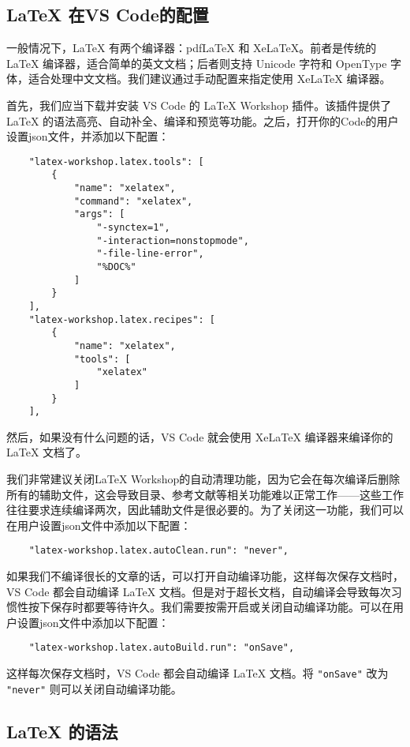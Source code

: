 \documentclass[../main.tex]{subfiles}
\begin{document}
\subsection{LaTeX 在VS Code的配置}

一般情况下，LaTeX 有两个编译器：pdfLaTeX 和 XeLaTeX。前者是传统的 LaTeX 编译器，适合简单的英文文档；后者则支持 Unicode 字符和 OpenType 字体，适合处理中文文档。我们建议通过手动配置来指定使用 XeLaTeX 编译器。

首先，我们应当下载并安装 VS Code 的 LaTeX Workshop 插件。该插件提供了 LaTeX 的语法高亮、自动补全、编译和预览等功能。之后，打开你的Code的用户设置json文件，并添加以下配置：

\begin{lstlisting}
    "latex-workshop.latex.tools": [
        {
            "name": "xelatex",
            "command": "xelatex",
            "args": [
                "-synctex=1",
                "-interaction=nonstopmode",
                "-file-line-error",
                "%DOC%"
            ]
        }
    ],
    "latex-workshop.latex.recipes": [
        {
            "name": "xelatex",
            "tools": [
                "xelatex"
            ]
        }
    ],
\end{lstlisting}

然后，如果没有什么问题的话，VS Code 就会使用 XeLaTeX 编译器来编译你的 LaTeX 文档了。

我们非常建议关闭LaTeX Workshop的自动清理功能，因为它会在每次编译后删除所有的辅助文件，这会导致目录、参考文献等相关功能难以正常工作——这些工作往往要求连续编译两次，因此辅助文件是很必要的。为了关闭这一功能，我们可以在用户设置json文件中添加以下配置：
\begin{lstlisting}
    "latex-workshop.latex.autoClean.run": "never",
\end{lstlisting}

如果我们不编译很长的文章的话，可以打开自动编译功能，这样每次保存文档时，VS Code 都会自动编译 LaTeX 文档。但是对于超长文档，自动编译会导致每次习惯性按下保存时都要等待许久。我们需要按需开启或关闭自动编译功能。可以在用户设置json文件中添加以下配置：
\begin{lstlisting}
    "latex-workshop.latex.autoBuild.run": "onSave",
\end{lstlisting}
这样每次保存文档时，VS Code 都会自动编译 LaTeX 文档。将 \texttt{"onSave"} 改为 \texttt{"never"} 则可以关闭自动编译功能。

\subsection{LaTeX 的语法}
\end{document}
